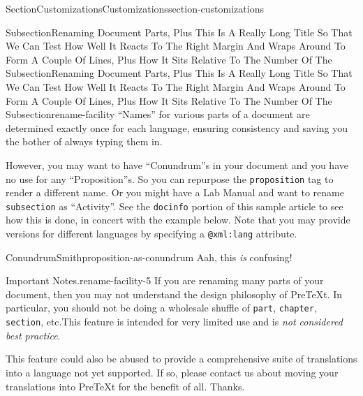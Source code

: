 \documentclass[twoside,10pt,]{article}
\newcommand{\mono}[1]{\texttt{#1}}
\numberwithin{equation}{section}
\begin{document}
\begin{sectionptx}{Section}{Customizations}{}{Customizations}{}{}{section-customizations}
%
%
\typeout{************************************************}
\typeout{************************************************}
%
\begin{subsectionptx}{Subsection}{Renaming Document Parts, Plus This Is A Really Long Title So That We Can Test How Well It Reacts To The Right Margin And Wraps Around To Form A Couple Of Lines, Plus How It Sits Relative To The Number Of The Subsection}{}{Renaming Document Parts, Plus This Is A Really Long Title So That We Can Test How Well It Reacts To The Right Margin And Wraps Around To Form A Couple Of Lines, Plus How It Sits Relative To The Number Of The Subsection}{}{}{rename-facility}
``Names'' for various parts of a document are determined exactly once for each language, ensuring consistency and saving you the bother of always typing them in.%
\par
However, you may want to have ``Conundrum''s in your document and you have no use for any ``Proposition''s.  So you can repurpose the \mono{proposition} tag to render a different name.  Or you might have a Lab Manual and want to rename \mono{subsection} as ``Activity''.  See the \mono{docinfo} portion of this sample article to see how this is done, in concert with the example below.  Note that you may provide versions for different languages by specifying a \mono{@xml:lang} attribute.%
\begin{proposition}{Conundrum}{}{Smith}{proposition-as-conundrum}%
Aah, this \emph{is} confusing!%
\end{proposition}
\begin{paragraphs}{Important Notes.}{rename-facility-5}%
If you are renaming many parts of your document, then you may not understand the design philosophy of PreTeXt.  In particular, you should not be doing a wholesale shuffle of \mono{part}, \mono{chapter}, \mono{section}, etc.\@  This feature is intended for very limited use and is \emph{not considered best practice}.%
\par
This feature could also be abused to provide a comprehensive suite of translations into a language not yet supported.  If so, please contact us about moving your translations into PreTeXt for the benefit of all.  Thanks.%

\end{paragraphs}
\end{subsectionptx}
\end{sectionptx}
\end{document}
